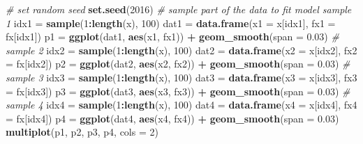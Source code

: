 \documentclass[12pt,]{krantz}
\makeatletter
\newenvironment{Shaded}{\begin{snugshade}}{\end{snugshade}}
\newcommand{\CommentTok}[1]{\textcolor[rgb]{0.37,0.37,0.37}{\textit{#1}}}
\newcommand{\DataTypeTok}[1]{\textcolor[rgb]{0.27,0.27,0.27}{#1}}
\newcommand{\DecValTok}[1]{\textcolor[rgb]{0.06,0.06,0.06}{#1}}
\newcommand{\FloatTok}[1]{\textcolor[rgb]{0.06,0.06,0.06}{#1}}
\newcommand{\KeywordTok}[1]{\textcolor[rgb]{0.27,0.27,0.27}{\textbf{#1}}}
\newcommand{\NormalTok}[1]{#1}
\newcommand{\OperatorTok}[1]{\textcolor[rgb]{0.43,0.43,0.43}{\textbf{#1}}}
\newcommand{\StringTok}[1]{\textcolor[rgb]{0.5,0.5,0.5}{#1}}
\newenvironment{kframe}{%
\medskip{}
\setlength{\fboxsep}{.8em}
 \def\at@end@of@kframe{}%
 \ifinner\ifhmode%
  \def\at@end@of@kframe{\end{minipage}}%
  \begin{minipage}{\columnwidth}%
 \fi\fi%
 \def\FrameCommand##1{\hskip\@totalleftmargin \hskip-\fboxsep
 \colorbox{shadecolor}{##1}\hskip-\fboxsep
     \hskip-\linewidth \hskip-\@totalleftmargin \hskip\columnwidth}%
 \MakeFramed {\advance\hsize-\width
   \@totalleftmargin\z@ \linewidth\hsize
   \@setminipage}}%
 {\par\unskip\endMakeFramed%
 \at@end@of@kframe}
\renewenvironment{Shaded}{\begin{kframe}}{\end{kframe}}
\makeatother
\begin{document}
\begin{Shaded}
\begin{Highlighting}[]
\CommentTok{# set random seed}
\KeywordTok{set.seed}\NormalTok{(}\DecValTok{2016}\NormalTok{)}
\CommentTok{# sample part of the data to fit model sample 1}
\NormalTok{idx1 =}\StringTok{ }\KeywordTok{sample}\NormalTok{(}\DecValTok{1}\OperatorTok{:}\KeywordTok{length}\NormalTok{(x), }\DecValTok{100}\NormalTok{)}
\NormalTok{dat1 =}\StringTok{ }\KeywordTok{data.frame}\NormalTok{(}\DataTypeTok{x1 =}\NormalTok{ x[idx1], }\DataTypeTok{fx1 =}\NormalTok{ fx[idx1])}
\NormalTok{p1 =}\StringTok{ }\KeywordTok{ggplot}\NormalTok{(dat1, }\KeywordTok{aes}\NormalTok{(x1, fx1)) }\OperatorTok{+}\StringTok{ }\KeywordTok{geom_smooth}\NormalTok{(}\DataTypeTok{span =} \FloatTok{0.03}\NormalTok{)}
\CommentTok{# sample 2}
\NormalTok{idx2 =}\StringTok{ }\KeywordTok{sample}\NormalTok{(}\DecValTok{1}\OperatorTok{:}\KeywordTok{length}\NormalTok{(x), }\DecValTok{100}\NormalTok{)}
\NormalTok{dat2 =}\StringTok{ }\KeywordTok{data.frame}\NormalTok{(}\DataTypeTok{x2 =}\NormalTok{ x[idx2], }\DataTypeTok{fx2 =}\NormalTok{ fx[idx2])}
\NormalTok{p2 =}\StringTok{ }\KeywordTok{ggplot}\NormalTok{(dat2, }\KeywordTok{aes}\NormalTok{(x2, fx2)) }\OperatorTok{+}\StringTok{ }\KeywordTok{geom_smooth}\NormalTok{(}\DataTypeTok{span =} \FloatTok{0.03}\NormalTok{)}
\CommentTok{# sample 3}
\NormalTok{idx3 =}\StringTok{ }\KeywordTok{sample}\NormalTok{(}\DecValTok{1}\OperatorTok{:}\KeywordTok{length}\NormalTok{(x), }\DecValTok{100}\NormalTok{)}
\NormalTok{dat3 =}\StringTok{ }\KeywordTok{data.frame}\NormalTok{(}\DataTypeTok{x3 =}\NormalTok{ x[idx3], }\DataTypeTok{fx3 =}\NormalTok{ fx[idx3])}
\NormalTok{p3 =}\StringTok{ }\KeywordTok{ggplot}\NormalTok{(dat3, }\KeywordTok{aes}\NormalTok{(x3, fx3)) }\OperatorTok{+}\StringTok{ }\KeywordTok{geom_smooth}\NormalTok{(}\DataTypeTok{span =} \FloatTok{0.03}\NormalTok{)}
\CommentTok{# sample 4}
\NormalTok{idx4 =}\StringTok{ }\KeywordTok{sample}\NormalTok{(}\DecValTok{1}\OperatorTok{:}\KeywordTok{length}\NormalTok{(x), }\DecValTok{100}\NormalTok{)}
\NormalTok{dat4 =}\StringTok{ }\KeywordTok{data.frame}\NormalTok{(}\DataTypeTok{x4 =}\NormalTok{ x[idx4], }\DataTypeTok{fx4 =}\NormalTok{ fx[idx4])}
\NormalTok{p4 =}\StringTok{ }\KeywordTok{ggplot}\NormalTok{(dat4, }\KeywordTok{aes}\NormalTok{(x4, fx4)) }\OperatorTok{+}\StringTok{ }\KeywordTok{geom_smooth}\NormalTok{(}\DataTypeTok{span =} \FloatTok{0.03}\NormalTok{)}
\KeywordTok{multiplot}\NormalTok{(p1, p2, p3, p4, }\DataTypeTok{cols =} \DecValTok{2}\NormalTok{)}
\end{Highlighting}
\end{Shaded}
\end{document}

